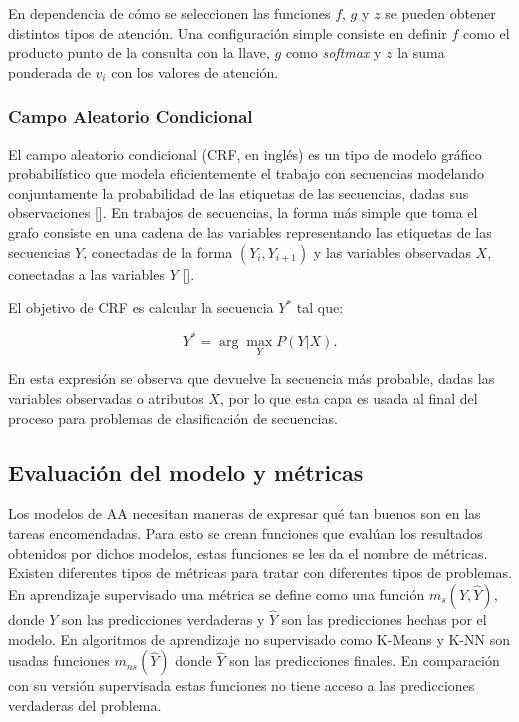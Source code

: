 En dependencia de cómo se seleccionen las funciones $f$, $g$ y $z$ se pueden obtener distintos tipos de atención.
Una configuración simple consiste en definir $f$ como el producto punto de la consulta con la llave,
$g$ como \emph{softmax} y $z$ la suma ponderada de $v_i$ con los valores de atención.

\subsubsection{Campo Aleatorio Condicional}


El campo aleatorio condicional (CRF, en inglés) es un 
tipo de modelo gráfico probabilístico que modela eficientemente el trabajo con secuencias
modelando conjuntamente la probabilidad de las etiquetas de las secuencias, dadas sus observaciones [\cite{lafferty2001conditional}].
En trabajos de secuencias, la forma más simple que toma el grafo consiste en una cadena de las variables representando
las etiquetas de las secuencias $Y$, conectadas de la forma $(Y_i, Y_{i+1})$ y las variables observadas $X$, conectadas
a las variables $Y$ [\cite{wallach2004conditional}].

El objetivo de CRF es calcular la secuencia $Y^*$ tal que:

\begin{equation}
	Y^* = \arg \max_Y P(Y | X).
\end{equation}\label{eq:crf}

En esta expresión se observa que devuelve la secuencia más probable, dadas las variables observadas o atributos $X$,
por lo que esta capa es usada al final del proceso para problemas de clasificación de secuencias.

\subsection{Evaluación del modelo y métricas}

Los modelos de AA necesitan maneras de expresar qué tan buenos son 
en las tareas encomendadas. Para esto se crean funciones que evalúan los resultados obtenidos
por dichos modelos, estas funciones se les da el nombre de métricas. Existen diferentes tipos de
métricas para tratar con diferentes tipos de problemas. En aprendizaje supervisado una métrica se
define como una función $m_s(Y, \hat{Y})$, donde $Y$ son las predicciones verdaderas y $\hat{Y}$ son las predicciones
hechas por el modelo. En algoritmos de aprendizaje no supervisado como K-Means y K-NN son usadas funciones $m_{ns}(\hat{Y})$
donde $\hat{Y}$ son las predicciones finales. En comparación con su versión supervisada estas funciones no tiene acceso
a las predicciones verdaderas del problema.

